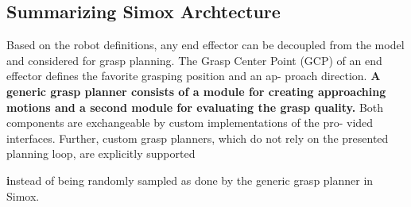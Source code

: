 \subsection{Summarizing Simox Archtecture}
Based on the robot definitions, any end effector can be decoupled
from the model and considered for grasp planning. The Grasp Center Point
(GCP) of an end effector defines the favorite grasping position and an ap-
proach direction. \textbf{A generic grasp planner consists of a module for creating
approaching motions and a second module for evaluating the grasp quality.}
Both components are exchangeable by custom implementations of the pro-
vided interfaces. Further, custom grasp planners, which do not rely on the
presented  planning  loop,  are  explicitly  supported \par
\textbf instead of being randomly sampled as done by the generic grasp planner
in Simox.

